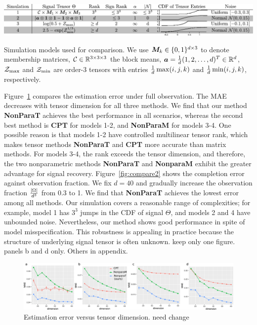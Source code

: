 \documentclass{article}
\theoremstyle{plain}
\theoremstyle{definition}
\begin{document}
\begin{table}[h]
\captionsetup{font=scriptsize}
\includegraphics[width=\textwidth]{figure/simulation2.pdf}
\vspace{-.5cm}
\caption{\scriptsize Simulation models used for comparison. We use $\bm M_k\in\{0,1\}^{d\times 3}$ to denote membership matrices, $\mathcal{C}\in\mathbb{R}^{3\times 3\times 3}$ the block means, $\bm{a}={1\over d}(1,2,\ldots,d)^T \in\mathbb{R}^d$, $\mathcal{Z}_{\max}$ and $\mathcal{Z}_{\min}$ are order-3 tensors with entries ${1\over d}\max(i,j,k)$ and ${1\over d}\min(i,j,k)$, respectively.}\label{tab:simulation}
\vspace{-.4cm}
\end{table}


Figure~\ref{fig:compare1} compares the estimation error under full observation. The MAE decreases with tensor dimension for all three methods. We find that our method {\bf NonParaT} achieves the best performance in all scenarios, whereas the second best method is {\bf CPT} for models 1-2, and {\bf NonParaM} for models 3-4. One possible reason is that models 1-2 have controlled multilinear tensor rank, which makes tensor methods {\bf NonParaT} and {\bf CPT} more accurate than matrix methods. For models 3-4, the rank exceeds the tensor dimension, and therefore, the two nonparametric methods {\bf NonParaT} and {\bf NonparaM} exhibit the greater advantage for signal recovery. Figure~\ref{fig:compare2} shows the completion error against observation fraction. We fix $d=40$ and gradually increase the observation fraction ${|\Omega|\over d^3}$ from 0.3 to 1. We find that {\bf NonParaT} achieves the lowest error among all methods. Our simulation covers a reasonable range of  complexities; for example, model 1 has $3^3$ jumps in the CDF of signal $\Theta$, and models 2 and 4 have unbounded noise. Nevertheless, our method shows good performance in spite of model misspecification. This robustness is appealing in practice because the structure of underlying signal tensor is often unknown. {\color{red} keep only one figure. panels b and d only. Others in appendix.}

\begin{figure}[h!]
\captionsetup{font=footnotesize}
\includegraphics[width=\textwidth]{figure/fig1-4v2.pdf}
\vspace{-.5cm}
\caption{\footnotesize Estimation error versus tensor dimension. {\color{red} need change}}\label{fig:compare1}
\end{figure}
\end{document}
